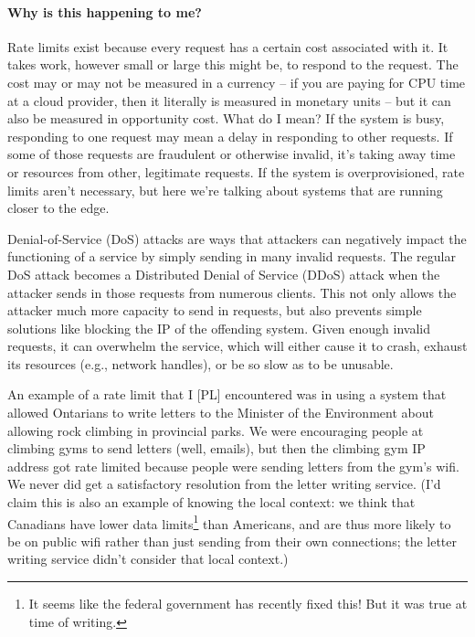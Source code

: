 \paragraph{Why is this happening to me?} Rate limits exist because every request has a certain cost associated with it. It takes work, however small or large this might be, to respond to the request. The cost may or may not be measured in a currency -- if you are paying for CPU time at a cloud provider, then it literally is measured in monetary units -- but it can also be measured in opportunity cost. What do I mean? If the system is busy, responding to one request may mean a delay in responding to other requests. If some of those requests are fraudulent or otherwise invalid, it's taking away time or resources from other, legitimate requests. If the system is overprovisioned, rate limits aren't necessary, but here we're talking about systems that are running closer to the edge.

Denial-of-Service (DoS) attacks are ways that attackers can negatively impact the functioning of a service by simply sending in many invalid requests. The regular DoS attack becomes a Distributed Denial of Service (DDoS) attack when the attacker sends in those requests from numerous clients. This not only allows the attacker much more capacity to send in requests, but also prevents simple solutions like blocking the IP of the offending system. Given enough invalid requests, it can overwhelm the service, which will either cause it to crash, exhaust its resources (e.g., network handles), or be so slow as to be unusable.

An example of a rate limit that I [PL] encountered was in using a system that allowed Ontarians to write letters to the Minister of the Environment about allowing rock climbing in provincial parks. We were encouraging people at climbing gyms to send letters (well, emails), but then the climbing gym IP address got rate limited because people were sending letters from the gym's wifi. We never did get a satisfactory resolution from the letter writing service. (I'd claim this is also an example of knowing the local context: we think that Canadians have lower data limits\footnote{It seems like the federal government has recently fixed this! But it was true at time of writing.} than Americans, and are thus more likely to be on public wifi rather than just sending from their own connections; the letter writing service didn't consider that local context.)

